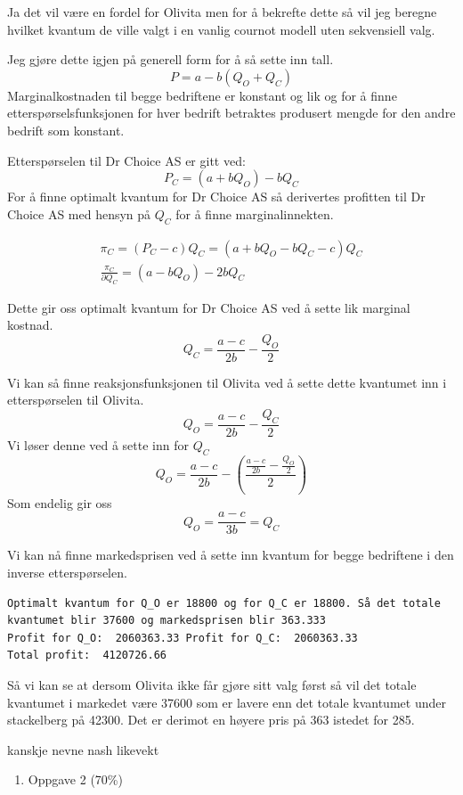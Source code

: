 \documentclass[
  12pt,
  a4paper,
  DIV=11,
  numbers=noendperiod]{scrartcl}
\providecommand{\tightlist}{%
  \setlength{\itemsep}{0pt}\setlength{\parskip}{0pt}}\usepackage{longtable,booktabs,array}
\begin{document}
Ja det vil være en fordel for Olivita men for å bekrefte dette så vil
jeg beregne hvilket kvantum de ville valgt i en vanlig cournot modell
uten sekvensiell valg.

Jeg gjøre dette igjen på generell form for å så sette inn tall. \[
P = a - b(Q_O + Q_C)
\] Marginalkostnaden til begge bedriftene er konstant og lik og for å
finne etterspørselsfunksjonen for hver bedrift betraktes produsert
mengde for den andre bedrift som konstant.

Etterspørselen til Dr Choice AS er gitt ved: \[
P_C = (a  + bQ_O)-bQ_C
\] For å finne optimalt kvantum for Dr Choice AS så derivertes profitten
til Dr Choice AS med hensyn på \(Q_C\) for å finne marginalinnekten.

\begin{align*}
\pi_C = (P_C - c)Q_C = (a  + bQ_O - bQ_C - c)Q_C \\
\frac{\pi_C}{\partial Q_C} = (a - bQ_O) - 2bQ_C
\end{align*}

Dette gir oss optimalt kvantum for Dr Choice AS ved å sette lik marginal
kostnad. \[
Q_C = \frac{a - c}{2b} - \frac{Q_O}{2}
\]

Vi kan så finne reaksjonsfunksjonen til Olivita ved å sette dette
kvantumet inn i etterspørselen til Olivita. \[
Q_O = \frac{a - c}{2b} - \frac{Q_C}{2}
\] Vi løser denne ved å sette inn for \(Q_C\) \[
Q_O = \frac{a - c}{2b} - \left(\frac{\frac{a - c}{2b} - \frac{Q_O}{2}}{2}\right)
\] Som endelig gir oss \[
Q_O = \frac{a - c}{3b} = Q_C
\]

Vi kan nå finne markedsprisen ved å sette inn kvantum for begge
bedriftene i den inverse etterspørselen.

\begin{verbatim}
Optimalt kvantum for Q_O er 18800 og for Q_C er 18800. Så det totale kvantumet blir 37600 og markedsprisen blir 363.333
Profit for Q_O:  2060363.33 Profit for Q_C:  2060363.33 
Total profit:  4120726.66
\end{verbatim}

Så vi kan se at dersom Olivita ikke får gjøre sitt valg først så vil det
totale kvantumet i markedet være 37600 som er lavere enn det totale
kvantumet under stackelberg på 42300. Det er derimot en høyere pris på
363 istedet for 285.

kanskje nevne nash likevekt

\clearpage

\begin{enumerate}
\def\labelenumi{\arabic{enumi}.}
\setcounter{enumi}{1}
\tightlist
\item
  Oppgave 2 (70\%)
\end{enumerate}
\end{document}
